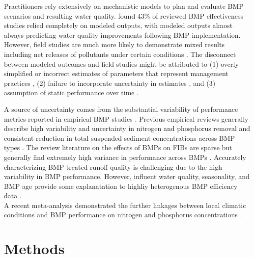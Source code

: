 \documentclass[utf8]{FrontiersinHarvard}
\begin{document}
Practitioners rely extensively on mechanistic models to plan and
evaluate BMP scenarios and resulting water quality.
\citet{linternBestManagementPractices2020} found 43\% of reviewed BMP
effectiveness studies relied completely on modeled outputs, with modeled
outputs almost always predicting water quality improvements following
BMP implementation. However, field studies are much more likely to
demonstrate mixed results including net releases of pollutants under
certain conditions
\citep{linternBestManagementPractices2020, liuReviewEffectivenessBest2017}.
The disconnect between modeled outcomes and field studies might be
attributed to (1) overly simplified or incorrect estimates of parameters
that represent management practices
\citep{ullrichApplicationSoilWater2009, fuReviewCatchmentscaleWater2019, linternBestManagementPractices2020},
(2) failure to incorporate uncertainty in estimates
\citep{tasdighiBayesianTotalUncertainty2018, fuReviewCatchmentscaleWater2019, linternBestManagementPractices2020},
and (3) assumption of static performance over time
\citep{mealsLagTimeWater2010, liuReviewEffectivenessBest2017, fuReviewCatchmentscaleWater2019}.

A source of uncertainty comes from the substantial variability of
performance metrics reported in empirical BMP studies
\citep{linternBestManagementPractices2020}. Previous empirical reviews
generally describe high variability and uncertainty in nitrogen and
phosphorus removal and consistent reduction in total suspended sediment
concentrations across BMP types
\citep{linternBestManagementPractices2020, liuReviewEffectivenessBest2017, kochNitrogenRemovalStormwater2014, claryBMPPerformanceAnalysis2011, barrettComparisonBMPPerformance2008, grudzinskiDoesRiparianFencing2020}.
The review literature on the effects of BMPs on FIBs are sparse but
generally find extremely high variance in performance across BMPs
\citep{claryBMPPerformanceAnalysis2011, grudzinskiDoesRiparianFencing2020}.
Accurately characterizing BMP treated runoff quality is challenging due
to the high variability in BMP performance. However, influent water
quality, seasonality, and BMP age provide some explanatation to highliy
heterogenous BMP efficiency data
\citep{barrettPerformanceComparisonStructural2005, liuReviewEffectivenessBest2017}.\\
A recent meta-analysis demonstrated the further linkages between local
climatic conditions and BMP performance on nitrogen and phosphorus
concentrations \citep{horvathEffectsRegionalClimate2023}.

\hypertarget{methods}{%
\section{Methods}\label{methods}}
\end{document}
